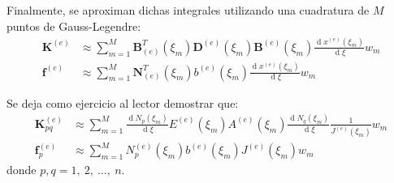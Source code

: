 \documentclass[12pt,letterpaper]{article}
\newcommand{\ma}[1]{{\boldsymbol{#1}}}
\newcommand{\dd}{\operatorname{d} \!}
\begin{document}
Finalmente, se aproximan dichas integrales utilizando una cuadratura de $M$ puntos de Gauss-Legendre:
\begin{align}
\ma{K}^{(e)} &\approx \sum_{m=1}^M \ma{B}_{(e)}^T(\xi_m) \ma{D}^{(e)}(\xi_m) \ma{B}^{(e)}(\xi_m) \frac{\dd x^{(e)}(\xi_m)}{\dd \xi} w_m\\
\ma{f}^{(e)} &\approx \sum_{m=1}^M  \ma{N}_{(e)}^T(\xi_m) b^{(e)}(\xi_m) \frac{\dd x^{(e)}(\xi_m)}{\dd \xi} w_m
\end{align}

Se deja como ejercicio al lector demostrar que:
\begin{align}
\ma{K}^{(e)}_{pq} &\approx \sum_{m=1}^M \frac{\dd N_p(\xi_m)}{\dd \xi} E^{(e)}(\xi_m) A^{(e)}(\xi_m) \frac{\dd N_q(\xi_m)}{\dd \xi} \frac{1}{J^{(e)}(\xi_m)} w_m\\
\ma{f}^{(e)}_p &\approx \sum_{m=1}^M  N_p^{(e)}(\xi_m) b^{(e)}(\xi_m) J^{(e)}(\xi_m) w_m
\end{align}
donde $p, q = 1,\ 2, \ \ldots,\ n$.
\end{document}
